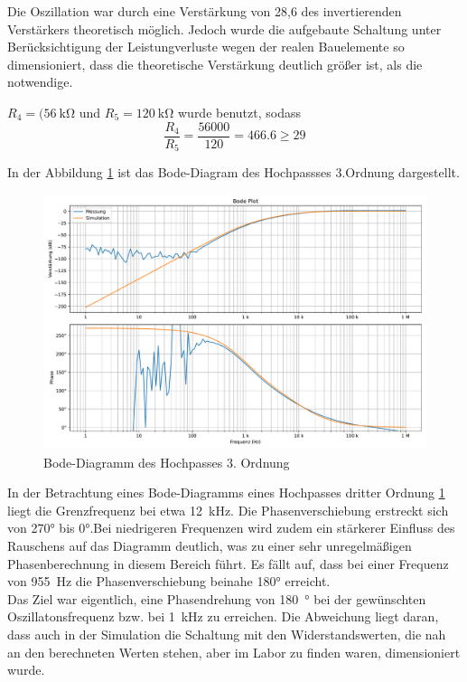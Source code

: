 Die Oszillation war durch eine Verstärkung von 28,6 des invertierenden Verstärkers theoretisch möglich. Jedoch wurde die aufgebaute Schaltung unter Berücksichtigung der Leistungverluste wegen der realen Bauelemente so dimensioniert, dass die theoretische Verstärkung deutlich größer ist, als die notwendige.

 $R_4=(\SI{56}{\kilo\ohm}$ und $R_5=\SI{120}{\kilo\ohm}$ wurde benutzt, sodass \[ \frac{R_4}{R_5} = \frac{56000}{120} = 466.6 \geq 29\] 

In der Abbildung \ref{fig:hochpass3ordnungbode} ist das Bode-Diagram des Hochpassses 3.Ordnung  dargestellt.


\begin{figure}[H]
  \centering
  \includegraphics[width=\linewidth]{Elektronik-Laborprotokoll_Filter/Plots/hochpass3ordnungbode.pdf}
  \caption{Bode-Diagramm des Hochpasses 3. Ordnung}
  \label{fig:hochpass3ordnungbode}
\end{figure}

In der Betrachtung eines Bode-Diagramms eines Hochpasses dritter Ordnung \ref{fig:hochpass3ordnungbode} liegt die Grenzfrequenz bei etwa \SI{12}{\kilo\hertz}. Die Phasenverschiebung erstreckt sich von \ang{270} bis \ang{0}.Bei niedrigeren Frequenzen wird zudem ein stärkerer Einfluss des Rauschens auf das Diagramm deutlich, was zu einer sehr unregelmäßigen Phasenberechnung in diesem Bereich führt. Es fällt auf, dass bei einer Frequenz von \SI{955}{\hertz} die Phasenverschiebung beinahe \ang{180} erreicht. \\
Das Ziel war eigentlich, eine Phasendrehung von \SI{180}{\degree} bei der gewünschten Oszillatonsfrequenz bzw. bei \SI{1}{\kilo\hertz} zu erreichen. Die Abweichung liegt daran, dass auch in der Simulation die Schaltung mit den Widerstandswerten, die nah an den berechneten Werten stehen, aber im Labor zu finden waren, dimensioniert wurde.

